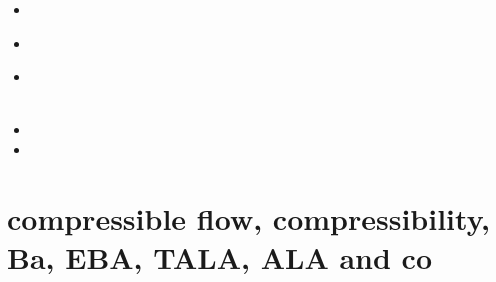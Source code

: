 \begin{small}
\begin{itemize}
\item[\twothousand] 
\item[\twothousandfour] 
 \\
\item[\twothousandsix] 
 \\
 \\
\item[\twothousandseven] 
\item[\twothousandeleven] 
\end{itemize}
\end{small}









\section{compressible flow, compressibility, Ba, EBA, TALA, ALA and co}

